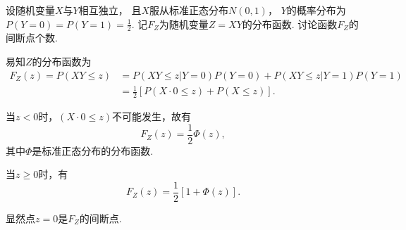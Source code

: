 \begin{example}
设随机变量\(X\)与\(Y\)相互独立，
且\(X\)服从标准正态分布\(N(0,1)\)，
\(Y\)的概率分布为\(P(Y=0) = P(Y=1) = \frac12\).
记\(F_Z\)为随机变量\(Z=XY\)的分布函数.
讨论函数\(F_Z\)的间断点个数.
\begin{solution}
易知\(Z\)的分布函数为\begin{align*}
	F_Z(z) = P(XY \leq z)
	&= P(XY \leq z \vert Y = 0) P(Y = 0)
	+ P(XY \leq z \vert Y = 1) P(Y = 1) \\
	&= \frac12 \left[ P(X\cdot0 \leq z) + P(X \leq z) \right].
\end{align*}

当\(z < 0\)时，\((X\cdot0 \leq z)\)不可能发生，故有\[
	F_Z(z) = \frac12 \Phi(z),
\]
其中\(\Phi\)是标准正态分布的分布函数.

当\(z \geq 0\)时，有\[
	F_Z(z) = \frac12 [1 + \Phi(z)].
\]

显然点\(z=0\)是\(F_Z\)的间断点.
\end{solution}
\end{example}

